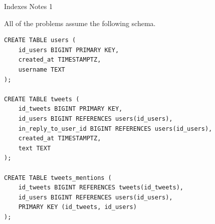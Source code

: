 \documentclass[12pt]{exam}
\theoremstyle{definition}
\begin{document}
\begin{center}
    {
\Large
Indexes Notes 1
}
\end{center}

\noindent
All of the problems assume the following schema.
\begin{lstlisting}
CREATE TABLE users (
    id_users BIGINT PRIMARY KEY,
    created_at TIMESTAMPTZ,
    username TEXT
);

CREATE TABLE tweets (
    id_tweets BIGINT PRIMARY KEY,
    id_users BIGINT REFERENCES users(id_users),
    in_reply_to_user_id BIGINT REFERENCES users(id_users),
    created_at TIMESTAMPTZ,
    text TEXT
);

CREATE TABLE tweets_mentions (
    id_tweets BIGINT REFERENCES tweets(id_tweets),
    id_users BIGINT REFERENCES users(id_users),
    PRIMARY KEY (id_tweets, id_users)
);
\end{lstlisting}
\end{document}
